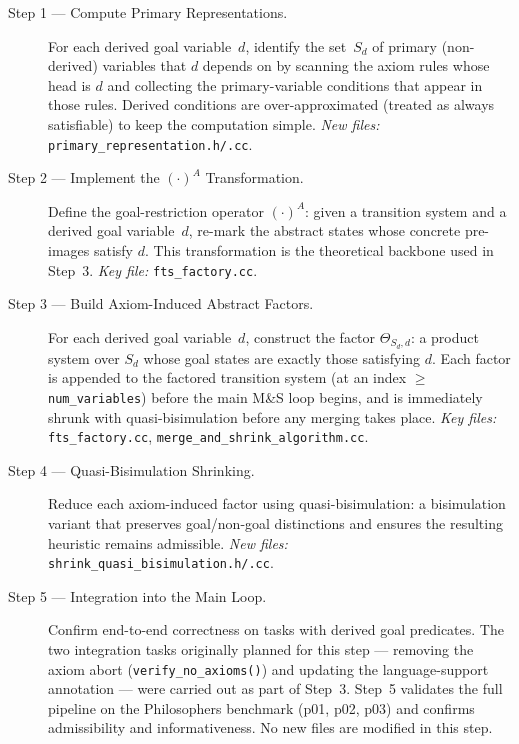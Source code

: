 \documentclass[11pt,a4paper]{article}
\begin{document}
\begin{description}
  \item[Step 1 — Compute Primary Representations.]
    For each derived goal variable~$d$, identify the set~$S_d$ of primary
    (non-derived) variables that $d$ depends on by scanning the axiom rules
    whose head is $d$ and collecting the primary-variable conditions that appear
    in those rules.  Derived conditions are over-approximated (treated as always
    satisfiable) to keep the computation simple.
    \emph{New files:} \texttt{primary\_representation.h/.cc}.

  \item[Step 2 — Implement the $(\cdot)^A$ Transformation.]
    Define the goal-restriction operator $(\cdot)^A$: given a transition system
    and a derived goal variable~$d$, re-mark the abstract states whose concrete
    pre-images satisfy $d$.  This transformation is the theoretical backbone
    used in Step~3.
    \emph{Key file:} \texttt{fts\_factory.cc}.

  \item[Step 3 — Build Axiom-Induced Abstract Factors.]
    For each derived goal variable~$d$, construct the factor $\Theta_{S_d,d}$:
    a product system over $S_d$ whose goal states are exactly those satisfying
    $d$.  Each factor is appended to the factored transition system (at an index
    $\geq$ \texttt{num\_variables}) before the main M\&S loop begins, and is
    immediately shrunk with quasi-bisimulation before any merging takes place.
    \emph{Key files:} \texttt{fts\_factory.cc},
    \texttt{merge\_and\_shrink\_algorithm.cc}.

  \item[Step 4 — Quasi-Bisimulation Shrinking.]
    Reduce each axiom-induced factor using quasi-bisimulation: a bisimulation
    variant that preserves goal/non-goal distinctions and ensures the resulting
    heuristic remains admissible.
    \emph{New files:} \texttt{shrink\_quasi\_bisimulation.h/.cc}.

  \item[Step 5 — Integration into the Main Loop.]
    Confirm end-to-end correctness on tasks with derived goal predicates.
    The two integration tasks originally planned for this step — removing the
    axiom abort (\texttt{verify\_no\_axioms()}) and updating the
    language-support annotation — were carried out as part of Step~3.
    Step~5 validates the full pipeline on the Philosophers benchmark
    (p01, p02, p03) and confirms admissibility and informativeness.
    No new files are modified in this step.
\end{description}
\end{document}
